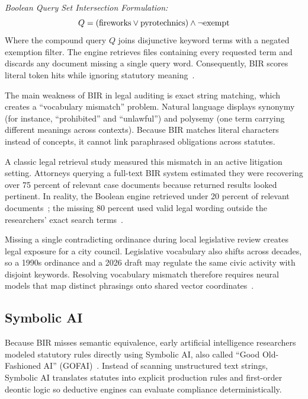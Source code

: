     \noindent\textit{Boolean Query Set Intersection Formulation:}
    \begin{equation}
        Q = (\text{fireworks} \lor \text{pyrotechnics}) \land \neg \text{exempt}
        \label{eq:boolean_query}
        \eqcaption{Boolean Query Set Intersection Formulation}
    \end{equation}
    \noindent Where the compound query $Q$ joins disjunctive keyword terms with a negated exemption filter. The engine retrieves files containing every requested term and discards any document missing a single query word. Consequently, BIR scores literal token hits while ignoring statutory meaning~\cite{blair1985an}.

        The main weakness of BIR in legal auditing is exact string matching, which creates a ``vocabulary mismatch'' problem. Natural language displays synonymy (for instance, ``prohibited'' and ``unlawful'') and polysemy (one term carrying different meanings across contexts). Because BIR matches literal characters instead of concepts, it cannot link paraphrased obligations across statutes.
        
        A classic legal retrieval study measured this mismatch in an active litigation setting. Attorneys querying a full-text BIR system estimated they were recovering over 75 percent of relevant case documents because returned results looked pertinent. In reality, the Boolean engine retrieved under 20 percent of relevant documents~\cite{blair1985an}; the missing 80 percent used valid legal wording outside the researchers' exact search terms~\cite{opijnen2017on}.

        Missing a single contradicting ordinance during local legislative review creates legal exposure for a city council. Legislative vocabulary also shifts across decades, so a 1990s ordinance and a 2026 draft may regulate the same civic activity with disjoint keywords. Resolving vocabulary mismatch therefore requires neural models that map distinct phrasings onto shared vector coordinates~\cite{kim2024legal}.

    \subsection{Symbolic AI}
    Because BIR misses semantic equivalence, early artificial intelligence researchers modeled statutory rules directly using Symbolic AI, also called ``Good Old-Fashioned AI'' (GOFAI)~\cite{vellino1986artificial}. Instead of scanning unstructured text strings, Symbolic AI translates statutes into explicit production rules and first-order deontic logic so deductive engines can evaluate compliance deterministically.

